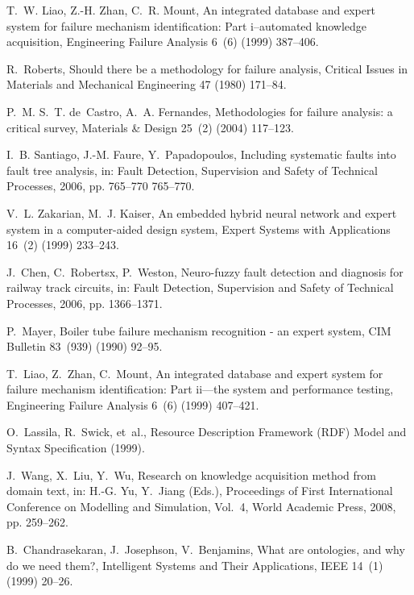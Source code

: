 \documentclass{elsarticle}
\begin{document}
\begin{thebibliography}{10}
T.~W. Liao, Z.-H. Zhan, C.~R. Mount,
  {An integrated database and expert system for failure
  mechanism identification: Part i--automated knowledge acquisition},
  Engineering Failure Analysis 6~(6) (1999) 387--406.


R.~Roberts, Should there be a methodology for failure analysis, Critical Issues
  in Materials and Mechanical Engineering 47 (1980) 171--84.

P.~M. S.~T. de~Castro, A.~A. Fernandes,
 {Methodologies for failure analysis: a critical
  survey}, Materials \& Design 25~(2) (2004) 117--123.


I.~B. Santiago, J.-M. Faure, Y.~Papadopoulos, Including systematic faults into
  fault tree analysis, in: Fault Detection, Supervision and Safety of Technical
  Processes, 2006, pp. 765--770 765--770.

V.~L. Zakarian, M.~J. Kaiser,
 {An embedded hybrid neural network and expert system
  in a computer-aided design system}, Expert Systems with Applications 16~(2)
  (1999) 233--243.


J.~Chen, C.~Robertsx, P.~Weston, Neuro-fuzzy fault detection and diagnosis for
  railway track circuits, in: Fault Detection, Supervision and Safety of
  Technical Processes, 2006, pp. 1366--1371.

P.~Mayer, Boiler tube failure mechanism recognition - an expert system, CIM
  Bulletin 83~(939) (1990) 92--95.

T.~Liao, Z.~Zhan, C.~Mount, An integrated database and expert system for
  failure mechanism identification: Part ii—the system and performance
  testing, Engineering Failure Analysis 6~(6) (1999) 407--421.

O.~Lassila, R.~Swick, et~al., {Resource Description Framework (RDF) Model and
  Syntax Specification} (1999).

J.~Wang, X.~Liu, Y.~Wu, Research on knowledge acquisition method from domain
  text, in: H.-G. Yu, Y.~Jiang (Eds.), Proceedings of First International
  Conference on Modelling and Simulation, Vol.~4, World Academic Press, 2008,
  pp. 259--262.

B.~Chandrasekaran, J.~Josephson, V.~Benjamins, What are ontologies, and why do
  we need them?, Intelligent Systems and Their Applications, IEEE 14~(1) (1999)
  20--26.



\end{thebibliography}
\end{document}
